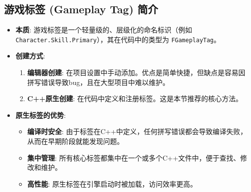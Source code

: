 \documentclass[math,code,10pt,CJKmath]{amznotes}
\begin{document}
\subsection{游戏标签 (Gameplay Tag) 简介}
\begin{itemize}
    \item \textbf{本质}: 游戏标签是一个轻量级的、层级化的命名标识（例如 \texttt{Character.Skill.Primary}），其在代码中的类型为 \texttt{FGameplayTag}。
    \item \textbf{创建方式}:
    \begin{enumerate}
        \item \textbf{编辑器创建}: 在项目设置中手动添加。优点是简单快捷，但缺点是容易因拼写错误导致bug，且在大型项目中难以维护。
        \item \textbf{C++原生创建}: 在代码中定义和注册标签。这是本节推荐的核心方法。
    \end{enumerate}
    \item \textbf{原生标签的优势}:
    \begin{itemize}
        \item \textbf{编译时安全}: 由于标签在C++中定义，任何拼写错误都会导致编译失败，从而在早期阶段就能发现问题。
        \item \textbf{集中管理}: 所有核心标签都集中在一个或多个C++文件中，便于查找、修改和维护。
        \item \textbf{高性能}: 原生标签在引擎启动时被加载，访问效率更高。
    \end{itemize}
\end{itemize}
\end{document}
